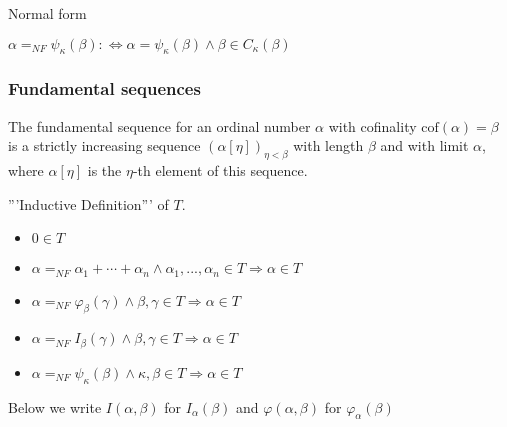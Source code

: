 \documentclass[10pt]{article}
\begin{document}
Normal form

\(\alpha=_{NF}\psi_\kappa(\beta):\Leftrightarrow\alpha=\psi_\kappa(\beta)\wedge\beta\in C_\kappa(\beta)\)


\subsubsection{Fundamental sequences}
 
The fundamental sequence for an ordinal number \(\alpha\) with cofinality \(\text{cof}(\alpha)=\beta\) is a strictly increasing sequence \((\alpha[\eta])_{\eta<\beta}\) with length \(\beta\) and with limit \(\alpha\), where \(\alpha[\eta]\) is the \(\eta\)-th element of this sequence.

'''Inductive Definition''' of \(T\).
\begin{itemize}
     \setlength{\itemsep}{1pt}
     \setlength{\parskip}{0pt}
     \setlength{\parsep}{0pt}
\item \(0 \in T\)
\item \(\alpha=_{NF}\alpha _{1}+\cdots +\alpha _{n}\wedge \alpha _{1},... ,\alpha _{n}\in T\Rightarrow\alpha\in T\)
\item \(\alpha=_{NF}\varphi_\beta(\gamma)\wedge\beta,\gamma\in T\Rightarrow\alpha\in T\)
\item \(\alpha=_{NF}I_\beta(\gamma)\wedge\beta,\gamma\in T\Rightarrow\alpha\in T\)
\item \(\alpha=_{NF}\psi_\kappa(\beta)\wedge\kappa, \beta\in T\Rightarrow\alpha\in T\)
\end{itemize}

Below we write \(I(\alpha,\beta)\) for \(I_\alpha(\beta)\) and \(\varphi(\alpha,\beta)\) for \(\varphi_\alpha(\beta)\)
\end{document}
